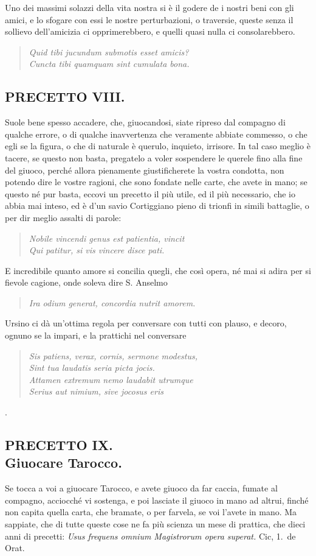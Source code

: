 \documentclass[11pt,a6paper]{article}
\newcommand{\literaryquote}[1]{%
\kern -6pt  \begin{verse}
    {\footnotesize \it #1}
  \end{verse}\kern -2pt%
}
\begin{document}
{Uno dei massimi solazzi della vita nostra si è il
godere de i nostri beni con gli amici, e lo sfogare con
essi le nostre perturbazioni, o traversie, queste
senza il sollievo dell'amicizia ci opprimerebbero, e
quelli quasi nulla ci consolarebbero.
\literaryquote{
Quid tibi jucundum submotis esset amicis?\\
Cuncta tibi quamquam sint cumulata bona.}

}

\subsection{PRECETTO VIII.}

Suole bene spesso accadere, che, giuocandosi,
siate ripreso dal compagno di qualche
errore, o di qualche inavvertenza che
veramente abbiate commesso, o che egli se la
figura, o che di naturale è querulo, inquieto,
irrisore. In tal caso meglio è tacere, se
questo non basta, pregatelo a voler sospendere
le querele fino alla fine del giuoco, perché
allora pienamente giustificherete la vostra
condotta, non potendo dire le vostre ragioni,
che sono fondate nelle carte, che avete in
mano; se questo né pur basta, eccovi un
precetto il più utile, ed il più necessario, che io
abbia mai inteso, ed è d'un savio Cortiggiano
pieno di trionfi in simili battaglie, o per
dir meglio assalti di parole:
\literaryquote{Nobile vincendi genus est patientia, vincit\\
Qui patitur, si vis vincere disce pati.}

E incredibile quanto amore si concilia quegli,
che così opera, né mai si adira per si fievole
cagione, onde soleva dire S. Anselmo
\literaryquote{Ira odium generat, concordia nutrit amorem.}

Ursino ci dà un'ottima regola per conversare
con tutti con plauso, e decoro, ognuno se la
impari, e la prattichi nel conversare
\literaryquote{Sis patiens, verax, cornis, sermone modestus,\\
Sint tua laudatis seria picta jocis.\\
Attamen extremum nemo laudabit utrumque\\
Serius aut nimium, sive jocosus eris}.


\subsection{PRECETTO IX.\\
 \footnotesize Giuocare Tarocco.}

Se tocca a voi a giuocare Tarocco, e avete
giuoco da far caccia, fumate al compagno,
acciocché vi sostenga, e poi lasciate il
giuoco in mano ad altrui, finché non capita
quella carta, che bramate, o per farvela, se
voi l'avete in mano. Ma sappiate, che di
tutte queste cose ne fa più scienza un mese di
prattica, che dieci anni di precetti: \textit{Usus
frequens omnium Magistrorum opera superat.}
Cic, 1.\ de Orat.
\end{document}
